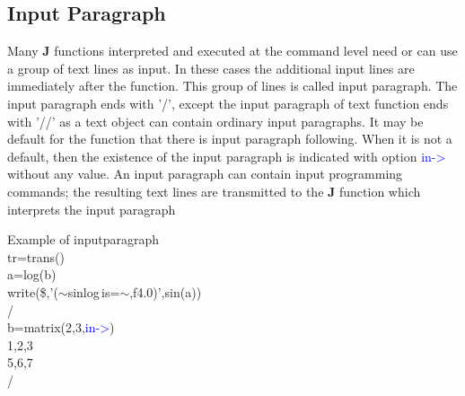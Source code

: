 \subsection{Input Paragraph}
\label{inpupara}
Many \textbf{J} functions interpreted and executed at the command level need or can use a group of
text lines as input. In these cases the additional input lines are immediately after the function.
This group of lines is called input paragraph. The input paragraph ends with '/', except the
input paragraph of text function ends with '//' as a text object can contain ordinary input
paragraphs. It may be default for the function that there is input paragraph following. When
it is not a default, then the existence of the input paragraph is indicated with option \textcolor{blue}{in->}
without any value. An input paragraph can contain input programming commands; the
resulting text lines are transmitted to the \textbf{J} function which interprets the input paragraph
\begin{example}[inpuparag]Example of inputparagraph\\
\label{inpuparag}
tr=\textcolor{VioletRed}{trans}()\\
a=\textcolor{VioletRed}{log}(b)\\
\textcolor{VioletRed}{write}(\$,'($\sim$sinlog\,is=$\sim$,f4.0)',\textcolor{VioletRed}{sin}(a))\\
/\\
b=\textcolor{VioletRed}{matrix}(2,3,\textcolor{blue}{in->})\\
1,2,3\\
5,6,7\\
/
\end{example}
